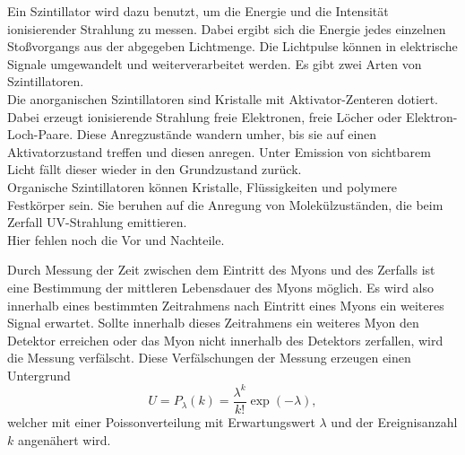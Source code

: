 Ein Szintillator wird dazu benutzt, um die Energie und die Intensität ionisierender Strahlung zu messen. Dabei ergibt sich die Energie 
jedes einzelnen Stoßvorgangs aus der abgegeben Lichtmenge.
Die Lichtpulse können in elektrische Signale umgewandelt und weiterverarbeitet werden.
Es gibt zwei Arten von Szintillatoren.\\
Die anorganischen Szintillatoren sind Kristalle mit Aktivator-Zenteren dotiert. Dabei erzeugt ionisierende Strahlung freie 
Elektronen, freie Löcher oder Elektron-Loch-Paare. Diese Anregzustände wandern umher, bis sie auf einen Aktivatorzustand treffen und diesen
anregen. Unter Emission von sichtbarem Licht fällt dieser wieder in den Grundzustand zurück.\\
Organische Szintillatoren können Kristalle, Flüssigkeiten und polymere Festkörper sein. Sie beruhen auf die Anregung von Molekülzuständen,
die beim Zerfall UV-Strahlung emittieren.\\
Hier fehlen noch die Vor und Nachteile.





Durch Messung der Zeit zwischen dem Eintritt des Myons und des
Zerfalls ist eine Bestimmung der mittleren Lebensdauer des Myons möglich.
Es wird also innerhalb eines bestimmten Zeitrahmens nach Eintritt eines Myons ein weiteres Signal
erwartet.
Sollte innerhalb dieses Zeitrahmens ein weiteres Myon den Detektor erreichen oder das
Myon nicht innerhalb des Detektors zerfallen, wird die Messung verfälscht.
Diese Verfälschungen der Messung erzeugen einen Untergrund
\begin{equation}
  U = P_{\lambda} (k) = \frac{\lambda^{k}}{k!} \exp{(-\lambda)},
  \label{eqn:Untergrundrate}
\end{equation}
welcher mit einer Poissonverteilung mit Erwartungswert $\lambda$ und der Ereignisanzahl $k$ angenähert wird.

